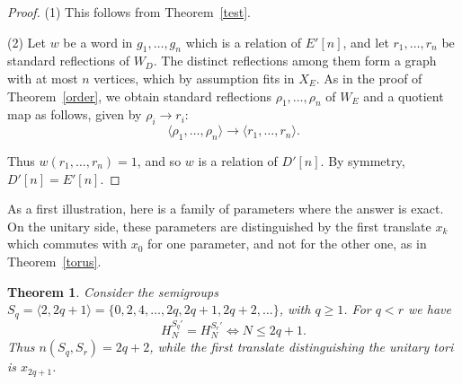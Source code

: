 \documentclass[11pt,a4paper]{article}
\newtheorem{thm}{Theorem}[section]
\begin{document}
\begin{proof}
(1) This follows from Theorem~\ref{test}.

(2) Let $w$ be a word in $g_1,\ldots,g_n$ which is a relation of $E'[n]$, and let $r_1,\ldots,r_n$ be standard reflections of $W_D$. The distinct reflections among them form a graph with at most $n$ vertices, which by assumption fits in $X_E$. As in the proof of Theorem~\ref{order}, we obtain standard reflections $\rho_1,\ldots,\rho_n$ of $W_E$ and a quotient map as follows, given by $\rho_i\to r_i$:
\[
 \langle\rho_1,\ldots,\rho_n\rangle\to\langle r_1,\ldots,r_n\rangle.
\]

Thus $w(r_1,\ldots,r_n)=1$, and so $w$ is a relation of $D'[n]$. By symmetry, $D'[n]=E'[n]$.
\end{proof}

As a first illustration, here is a family of parameters where the answer is exact. On the unitary side, these parameters are distinguished by the first translate $x_k$ which commutes with $x_0$ for one parameter, and not for the other one, as in Theorem~\ref{torus}.

\begin{thm}\label{separation-thm}
Consider the semigroups $S_q=\langle 2,2q+1\rangle=\{0,2,4,\ldots,2q,2q+1,2q+2,\ldots\}$, with $q\geq1$. For $q<r$ we have
\[
 H_N^{S_q'}=H_N^{S_r'}\iff N\leq 2q+1.
\]
Thus $n(S_q,S_r)=2q+2$, while the first translate distinguishing the unitary tori is $x_{2q+1}$.
\end{thm}
\end{document}
